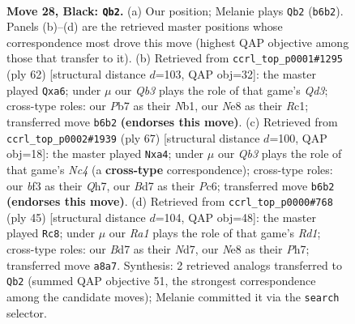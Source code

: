 \documentclass[11pt]{article}
\begin{document}
\clearpage

\begin{figure}[p]\centering
\begin{subfigure}{0.46\textwidth}\centering
\resizebox{\linewidth}{!}{%
\newchessgame
\chessboard[
  setfen={rn2nk2/1p1b3p/1q5p/p1P2p1P/P2N3P/5B2/8/RN1Q2K1 b - - 0 28},
  showmover=false,
  pgfstyle=straightmove, color=movearrow, markmove={b6-b2}
]}
\caption{}
\end{subfigure}\hfill
\begin{subfigure}{0.46\textwidth}\centering
\resizebox{\linewidth}{!}{%
\newchessgame
\chessboard[
  setfen={3r2k1/5pb1/pn2qn1p/8/3p1BpP/3Q2P1/P4PB1/1NR3K1 w - - 2 32},
  showmover=false,
  pgfstyle=straightmove, color=movearrow, markmove={d3-a6}
]}
\caption{}
\end{subfigure}
\\[4pt]
\begin{subfigure}{0.46\textwidth}\centering
\resizebox{\linewidth}{!}{%
\newchessgame
\chessboard[
  setfen={8/kp5q/2p2p2/p1n2P2/PbRN2P1/4PB1r/1P6/1K3Q2 b - - 0 34},
  showmover=false,
  pgfstyle=straightmove, color=movearrow, markmove={c5-a4}
]}
\caption{}
\end{subfigure}\hfill
\begin{subfigure}{0.46\textwidth}\centering
\resizebox{\linewidth}{!}{%
\newchessgame
\chessboard[
  setfen={3r2k1/3n2pp/4b3/p1q1pp2/2P5/P1Q1PP1N/6PP/1R2B1K1 b - - 0 23},
  showmover=false,
  pgfstyle=straightmove, color=movearrow, markmove={d8-c8}
]}
\caption{}
\end{subfigure}
\caption{\textbf{Move 28, Black: \texttt{Qb2}.} (a) Our position; Melanie plays \texttt{Qb2} (\texttt{b6b2}). Panels (b)--(d) are the retrieved master positions whose correspondence most drove this move (highest QAP objective among those that transfer to it). (b) Retrieved from \texttt{ccrl\_top\_p0001\#1295} (ply 62) [structural distance $d$=103, QAP obj=32]: the master played \texttt{Qxa6}; under $\mu$ our \emph{Qb3} plays the role of that game's \emph{Qd3}; cross-type roles: our \emph{P}b7 as their \emph{N}b1, our \emph{N}e8 as their \emph{R}c1; transferred move \texttt{b6b2} \textbf{(endorses this move)}. (c) Retrieved from \texttt{ccrl\_top\_p0002\#1939} (ply 67) [structural distance $d$=100, QAP obj=18]: the master played \texttt{Nxa4}; under $\mu$ our \emph{Qb3} plays the role of that game's \emph{Nc4} (a \textbf{cross-type} correspondence); cross-type roles: our \emph{b}f3 as their \emph{Q}h7, our \emph{B}d7 as their \emph{P}c6; transferred move \texttt{b6b2} \textbf{(endorses this move)}. (d) Retrieved from \texttt{ccrl\_top\_p0000\#768} (ply 45) [structural distance $d$=104, QAP obj=48]: the master played \texttt{Rc8}; under $\mu$ our \emph{Ra1} plays the role of that game's \emph{Rd1}; cross-type roles: our \emph{B}d7 as their \emph{N}d7, our \emph{N}e8 as their \emph{P}h7; transferred move \texttt{a8a7}. Synthesis: 2 retrieved analogs transferred to \texttt{Qb2} (summed QAP objective 51, the strongest correspondence among the candidate moves); Melanie committed it via the \texttt{search} selector.}
\label{fig:thought-m55}
\end{figure}
\end{document}
